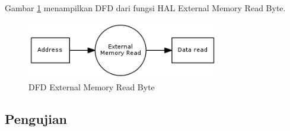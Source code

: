 Gambar \ref{fig-dfd-externalreadbyte} menampilkan DFD dari fungsi HAL External Memory Read Byte. 

\begin{figure}[!h]
\centering
\includegraphics[width=0.75\textwidth]{image/hal/dfd_externalreadbyte.png}
\caption{DFD External Memory Read Byte}
\label{fig-dfd-externalreadbyte}
\end{figure}


\subsection {Pengujian}


